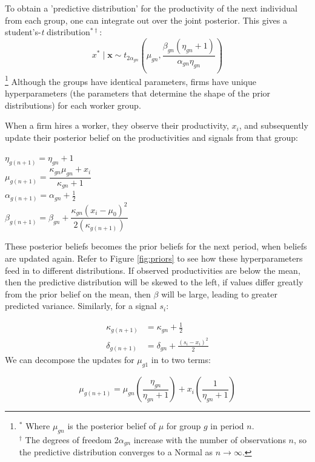 \documentclass[]{article}
\begin{document}
To obtain a 'predictive distribution' for the productivity of the next 
individual from each group, one can integrate out over the joint 
posterior. This gives a student's-\textit{t} distribution$^{\ast\dagger}$\citep{ramirezhassan2023}:
\begin{equation}
	x^* \mid \mathbf{x} \sim t_{2\alpha_{gn}}\!\left(\mu_{gn},
	\frac{\beta_{gn}(\eta_{gn}+1)}{\alpha_{gn}\eta_{gn}}\right)
	\label{eq:predective_prod}
\end{equation}
\noindent\footnote{\noindent$^{\ast}$ Where $\mu_{gn}$ is the posterior belief of $\mu$ for group $g$ in period $n$.\\$^{\dagger}$ The degrees of freedom $2\alpha_{gn}$ increase with the number of observations $n$, so the predictive distribution converges to a Normal as $n \to \infty$.}
Although the groups have identical parameters, firms have unique hyperparameters (the parameters that determine the shape of the prior distributions) for each worker group.

When a firm hires a worker, they observe their productivity, $x_i$, and subsequently update their posterior belief on the productivities and signals from that group:

\begin{center}
	$\eta_{g(n+1)} = \eta_{gn} + 1$ \\[1ex]
	$\mu_{g(n+1)} = \dfrac{\kappa_{gn} \mu_{gn} + x_i}{\kappa_{gn} + 1}$ \\[1ex]
	$\alpha_{g(n+1)} = \alpha_{gn} + \frac{1}{2}$ \\[1ex]
	$\beta_{g(n+1)} = \beta_{gn} + \dfrac{\kappa_{gn} (x_i - \mu_0)^2}{2(\kappa_{g(n+1)})}$
\end{center}
These posterior beliefs becomes the prior beliefs for the next period, when beliefs are updated again. Refer to Figure \ref{fig:priors} to see how these hyperparameters feed in to different distributions. If observed productivities are below the mean, then the predictive distribution will be skewed to the left, if values differ greatly from the prior belief on the mean, then $\beta$ will be large, leading to greater predicted variance.
Similarly, for a signal $s_i$:

\begin{align}
	\kappa_{g(n+1)} &= \kappa_{gn} + \frac{1}{2} \\[6pt]
	\delta_{g(n+1)} &= \delta_{gn} + \frac{(s_i - x_i)^2}{2}
\end{align}
We can decompose the updates for $\mu_{g1}$ in to two terms:
\begin{center} 
	$$ \mu_{g(n+1)} = \mu_{gn} \left(\frac{\eta_{gn}}{\eta_{gn} + 1}\right) + x_i \left(\frac{1}{\eta_{gn} + 1}\right)$$ 
\end{center}
\end{document}
